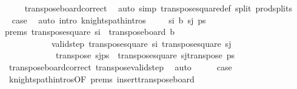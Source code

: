 \begin{isabellebody}
\ \ \ \ \isamarkupfalse%
\ transpose{\isacharunderscore}{\kern0pt}board{\isacharunderscore}{\kern0pt}correct\ \isamarkupfalse%
\ {\isacharparenleft}{\kern0pt}auto\ simp{\isacharcolon}{\kern0pt}\ transpose{\isacharunderscore}{\kern0pt}square{\isacharunderscore}{\kern0pt}def\ split{\isacharcolon}{\kern0pt}\ prod{\isachardot}{\kern0pt}splits{\isacharparenright}{\kern0pt}\isanewline
\ \ \isamarkupfalse%
\ \isamarkupfalse%
\ {\isacharquery}{\kern0pt}case\ \isamarkupfalse%
\ {\isacharparenleft}{\kern0pt}auto\ intro{\isacharcolon}{\kern0pt}\ knights{\isacharunderscore}{\kern0pt}path{\isachardot}{\kern0pt}intros{\isacharparenright}{\kern0pt}\isanewline
{}\isamarkupfalse%
\isanewline
\ \ \isamarkupfalse%
\ {\isacharparenleft}{\kern0pt}{}\ s\isactrlsub i\ b\ s\isactrlsub j\ ps{\isacharparenright}{\kern0pt}\isanewline
\ \ \isamarkupfalse%
\ \isamarkupfalse%
\ prems{\isacharcolon}{\kern0pt}\ {\isachardoublequoteopen}transpose{\isacharunderscore}{\kern0pt}square\ s\isactrlsub i\ {\isasymnotin}\ transpose{\isacharunderscore}{\kern0pt}board\ b{\isachardoublequoteclose}\ \isanewline
\ \ \ \ \ \ \ \ \ \ \ \ {\isachardoublequoteopen}valid{\isacharunderscore}{\kern0pt}step\ {\isacharparenleft}{\kern0pt}transpose{\isacharunderscore}{\kern0pt}square\ s\isactrlsub i{\isacharparenright}{\kern0pt}\ {\isacharparenleft}{\kern0pt}transpose{\isacharunderscore}{\kern0pt}square\ s\isactrlsub j{\isacharparenright}{\kern0pt}{\isachardoublequoteclose}\ \isanewline
\ \ \ \ \ \ \ \ \ \ \ \ \ {\isachardoublequoteopen}transpose\ {\isacharparenleft}{\kern0pt}s\isactrlsub j{\isacharhash}{\kern0pt}ps{\isacharparenright}{\kern0pt}\ {\isacharequal}{\kern0pt}\ transpose{\isacharunderscore}{\kern0pt}square\ s\isactrlsub j{\isacharhash}{\kern0pt}transpose\ ps{\isachardoublequoteclose}\isanewline
\ \ \ \ \isamarkupfalse%
\ {}\ transpose{\isacharunderscore}{\kern0pt}board{\isacharunderscore}{\kern0pt}correct\ transpose{\isacharunderscore}{\kern0pt}valid{\isacharunderscore}{\kern0pt}step\ \isamarkupfalse%
\ auto\isanewline
\ \ \isamarkupfalse%
\ \isamarkupfalse%
\ {\isacharquery}{\kern0pt}case\ \isanewline
\ \ \ \ \isamarkupfalse%
\ {}\ knights{\isacharunderscore}{\kern0pt}path{\isachardot}{\kern0pt}intros{\isacharparenleft}{\kern0pt}{}{\isacharparenright}{\kern0pt}{\isacharbrackleft}{\kern0pt}OF\ prems{\isacharbrackright}{\kern0pt}\ insert{\isacharunderscore}{\kern0pt}transpose{\isacharunderscore}{\kern0pt}board\ \isamarkupfalse%

\end{isabellebody}
